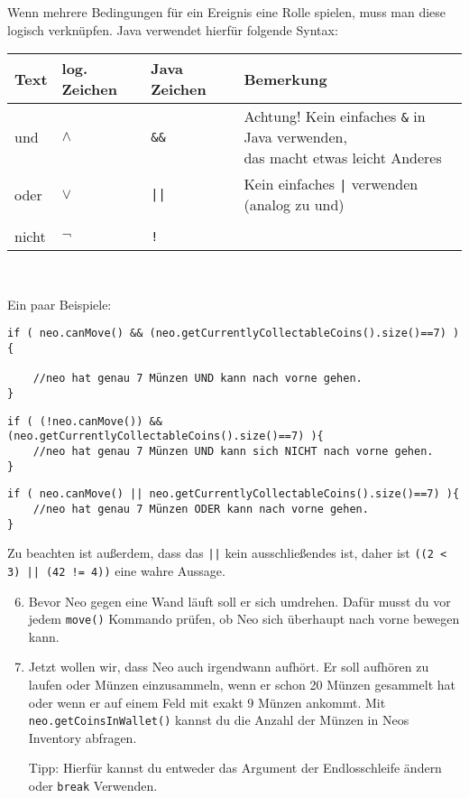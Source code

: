 \begin{Infobox}

	Wenn mehrere Bedingungen für ein Ereignis eine Rolle spielen, muss man diese logisch verknüpfen. 
	Java verwendet hierfür folgende Syntax:
	\begin{center}
		\begin{tabular}{ l | l | l | l}
			Text & log. Zeichen & Java Zeichen & Bemerkung \\ \hline
			und  & $\land$ & \texttt{\&\&} & \minibox{
					Achtung! Kein einfaches \texttt{\&} in Java verwenden,\\ 
					das macht etwas leicht Anderes 
			} \\
			oder & $\lor$ & \texttt{||} & Kein einfaches \texttt{|} verwenden (analog zu und) \\
			& &  \\
			nicht & $\neg$ & \texttt{!} &\\
		\end{tabular}\\
	\end{center}

	Ein paar Beispiele:

	\begin{lstlisting}[numbers=none]
if ( neo.canMove() && (neo.getCurrentlyCollectableCoins().size()==7) ){

	//neo hat genau 7 Münzen UND kann nach vorne gehen.
}
	\end{lstlisting}

	\begin{lstlisting}[numbers=none]
if ( (!neo.canMove()) && (neo.getCurrentlyCollectableCoins().size()==7) ){
	//neo hat genau 7 Münzen UND kann sich NICHT nach vorne gehen.
}
	\end{lstlisting}

	\begin{lstlisting}[numbers=none]
if ( neo.canMove() || neo.getCurrentlyCollectableCoins().size()==7) ){
	//neo hat genau 7 Münzen ODER kann nach vorne gehen.
}
	\end{lstlisting}

	Zu beachten ist außerdem, dass das  \lstinline{||} kein ausschließendes  ist, daher ist \lstinline{((2 < 3) || (42 != 4))} eine wahre Aussage.

\end{Infobox}


\begin{enumerate}\setcounter{enumi}{5}
	\item
		Bevor Neo gegen eine Wand läuft soll er sich umdrehen.
		Dafür musst du vor jedem \lstinline{move()} Kommando prüfen, ob Neo sich überhaupt nach vorne bewegen kann.

	\item
		Jetzt wollen wir, dass Neo auch irgendwann aufhört.
		Er soll aufhören zu laufen oder Münzen einzusammeln, wenn er schon 20 Münzen gesammelt hat oder wenn er auf einem Feld mit exakt 9 Münzen ankommt.
		Mit \lstinline{neo.getCoinsInWallet()} kannst du die Anzahl der Münzen in Neos Inventory abfragen.

		Tipp: Hierfür kannst du entweder das Argument der Endlosschleife ändern oder \lstinline{break} Verwenden.
\end{enumerate}
\newpage
